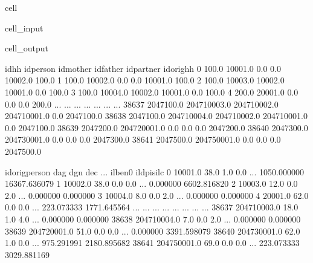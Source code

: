 \documentclass[letterpaper,10pt,english]{sphinxmanual}
\begin{document}
\begin{sphinxuseclass}{cell}
\begin{sphinxuseclass}{cell_input}
\begin{sphinxVerbatim}[commandchars=\\\{\}]
\PYG{p}{[}\PYG{p}{]}
\end{sphinxVerbatim}

\end{sphinxuseclass}
\begin{sphinxuseclass}{cell_output}
\begin{sphinxVerbatim}[commandchars=\\\{\}]
            idhh     idperson     idmother     idfather  idpartner   idorighh  \PYGZbs{}
0          100.0      10001.0          0.0          0.0    10002.0      100.0   
1          100.0      10002.0          0.0          0.0    10001.0      100.0   
2          100.0      10003.0      10002.0      10001.0        0.0      100.0   
3          100.0      10004.0      10002.0      10001.0        0.0      100.0   
4          200.0      20001.0          0.0          0.0        0.0      200.0   
...          ...          ...          ...          ...        ...        ...   
38637  2047100.0  204710003.0  204710002.0  204710001.0        0.0  2047100.0   
38638  2047100.0  204710004.0  204710002.0  204710001.0        0.0  2047100.0   
38639  2047200.0  204720001.0          0.0          0.0        0.0  2047200.0   
38640  2047300.0  204730001.0          0.0          0.0        0.0  2047300.0   
38641  2047500.0  204750001.0          0.0          0.0        0.0  2047500.0   

       idorigperson   dag  dgn  dec  ...      il\PYGZus{}ben0    il\PYGZus{}dpisilc  \PYGZbs{}
0           10001.0  38.0  1.0  0.0  ...  1050.000000  16367.636079   
1           10002.0  38.0  0.0  0.0  ...     0.000000   6602.816820   
2           10003.0  12.0  0.0  2.0  ...     0.000000      0.000000   
3           10004.0   8.0  0.0  2.0  ...     0.000000      0.000000   
4           20001.0  62.0  0.0  0.0  ...   223.073333   1771.645564   
...             ...   ...  ...  ...  ...          ...           ...   
38637   204710003.0  18.0  1.0  4.0  ...     0.000000      0.000000   
38638   204710004.0   7.0  0.0  2.0  ...     0.000000      0.000000   
38639   204720001.0  51.0  0.0  0.0  ...     0.000000   3391.598079   
38640   204730001.0  62.0  1.0  0.0  ...   975.291991   2180.895682   
38641   204750001.0  69.0  0.0  0.0  ...   223.073333   3029.881169   


\end{sphinxVerbatim}
\end{sphinxuseclass}
\end{sphinxuseclass}
\end{document}
